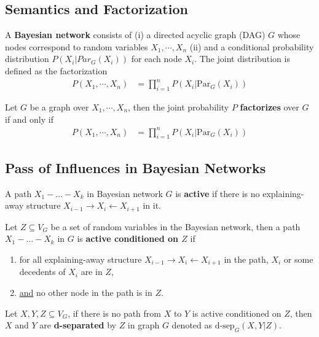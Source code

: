 \documentclass[11pt]{article}
\newcommand{\dsep}[0]{\text{d-sep}}
\newcommand{\pa}[0]{\text{Par}}
\begin{document}
	\subsection{Semantics and Factorization}
	\begin{definition}
		A \textbf{Bayesian network} consists of (i) a directed acyclic graph (DAG) $G$ whose nodes correspond to random variables $X_1, \cdots, X_n$
		 (ii) and a conditional probability distribution $P(X_i|Par_G(X_i))$ for each node $X_i$. The joint distribution is defined as the factorization
		 \begin{align}
		 	P(X_1, \cdots, X_n) &= \prod_{i=1}^n P(X_i|\pa_G(X_i))
		 \end{align}
	\end{definition}
	
	\begin{definition}
		Let $G$ be a graph over $X_1, \cdots, X_n$, then the joint probability $P$ \textbf{factorizes} over $G$ if and only if
		\begin{align}
			P(X_1, \cdots, X_n) &= \prod_{i=1}^n P(X_i|\pa_G(X_i))
		\end{align}
	\end{definition}
	
	\subsection{Pass of Influences in Bayesian Networks}
	\begin{definition}
		A path $X_1 - \dots - X_k$ in Bayesian network $G$ is \textbf{active} if there is no explaining-away structure $X_{i-1} \rightarrow X_i \leftarrow X_{i+1}$ in it.
	\end{definition}
	
	\begin{definition}
		Let $Z \subseteq V_G$ be a set of random variables in the Bayesian network, then a path $X_1 - \dots - X_k$ in $G$ is \textbf{active conditioned on $Z$} if 
		\begin{enumerate}
			\item for all explaining-away structure $X_{i-1} \rightarrow X_i \leftarrow X_{i+1}$ in the path, $X_i$ or some decedents of $X_i$ are in $Z$,
			\item \ul{and} no other node in the path is in $Z$.
		\end{enumerate}
	\end{definition}
	
	\begin{definition}
		Let $X, Y, Z \subseteq V_G$, if there is no path from $X$ to $Y$ is active conditioned on $Z$, then $X$ and $Y$ are \textbf{d-separated} by $Z$ in graph $G$ denoted as $\dsep_G(X, Y|Z)$.
	\end{definition}
	
\end{document}
